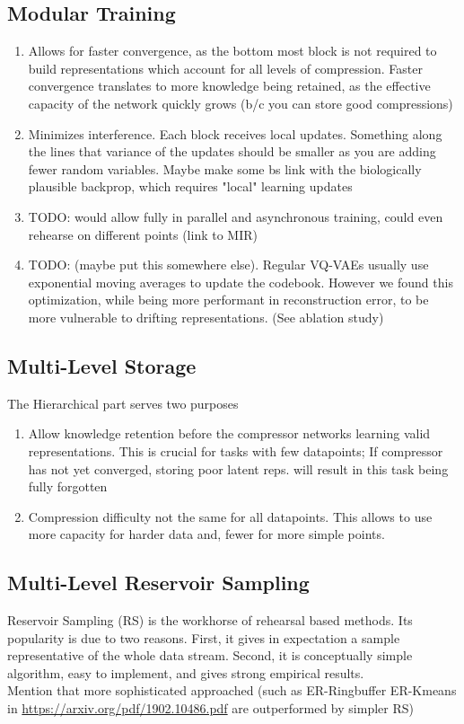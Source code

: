 \documentclass[colorinlistoftodos]{article} %
\begin{document}
\subsection{Modular Training}
\begin{enumerate}
    \item Allows for faster convergence, as the bottom most block is not required to build representations which account for all levels of compression. Faster convergence translates to more knowledge being retained, as the effective capacity of the network quickly grows (b/c you can store good compressions)
    \item Minimizes interference. Each block receives local updates. Something along the lines that variance of the updates should be smaller as you are adding fewer random variables. Maybe make some bs link with the biologically plausible backprop, which requires "local" learning updates
    \item TODO: would allow fully in parallel and asynchronous training, could even rehearse on different points (link to MIR)
    
    \item TODO: (maybe put this somewhere else). Regular VQ-VAEs usually use exponential moving averages to update the codebook. However we found this optimization, while being more performant in reconstruction error, to be more vulnerable to drifting representations. (See ablation study)

    
    
\end{enumerate}

\subsection{Multi-Level Storage}
The Hierarchical part  serves two purposes
\begin{enumerate}
    \item Allow knowledge retention before the compressor networks learning valid representations. This is crucial for tasks with few datapoints; If compressor has not yet converged, storing poor latent reps. will result in this task being fully forgotten
    \item Compression difficulty not the same for all datapoints. This allows to use more capacity for harder data and, fewer for more simple points.
\end{enumerate}

\subsection{Multi-Level Reservoir Sampling}
Reservoir Sampling (RS) is the workhorse of rehearsal based methods. Its popularity is due to two reasons. First, it gives in expectation a sample representative of the whole data stream.  Second, it is conceptually simple algorithm, easy to implement, and gives strong empirical results. \\
Mention that more sophisticated approached (such as ER-Ringbuffer ER-Kmeans in \url{https://arxiv.org/pdf/1902.10486.pdf} are outperformed by simpler RS) \\
\end{document}
